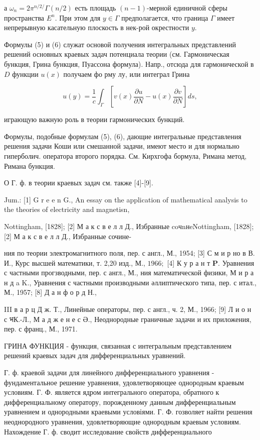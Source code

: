 \documentclass[10pt]{article}
\begin{document}
а $\omega_{n}=2 \pi^{n / 2 /} \Gamma(n / 2)$ есть площадь $(n-1)$-мерной единичной сферы пространства $E^{n}$. При этом для $y \in \Gamma$ предполагается, что граница $\Gamma$ имеет непрерывную касательную плоскость в нек-рой окрестности $y$.



Формулы (5) и (6) служат основой получения интегральных представлений решений основных краевых задач потенциала теории (см. Гармоническая бункция, Грина бункция, Пуассона формула). Напр., отсюда для гармонической в $D$ функции $u(x)$ получаем фо рму лу, или интеграл Грина



\[

u(y)=\frac{1}{c} \int_{\Gamma}\left[v(x) \frac{\partial u}{\partial N}-u(x) \frac{\partial v}{\partial N}\right] d s,

\]



играющую важную роль в теории гармонических бункций.



Формулы, подобные формулам (5), (6), дающие интегральные представления решения задачи Коши или смешанной задачи, имеют место и для нормально гиперболич. оператора второго порядка. См. Кирхгофа бормула, Римана метод, Римана бункция.



О Г. ф. в теории краевых задач см. также [4]-[9].



Jum.: [1] G r e e n G., An essay on the application of mathematical analysis to the theories of electricity and magnetisn,

Nottingham, [1828]; [2] М а к с в е л л Д., Избранные coчnнeNottingham, [1828]; [2] М а к с в е л л Д., Избранные сочине-

ния по теории электромагнитного поля, пер. с англ., М., 1954; [3] С м и р но в В. И., Курс высшей математики, т. 2,20 изд., М., $1966 ;$ [4] К у р а н т $\mathbf{P}$. Уравнения с частными прогзводными, пер. с англ., М., ния математической физики, М и р а н д a K., Уравнения с частными производными әллиптического типа, пер. с итал., М., 1957; [8] Д а н ф о р д Н.,

III в а р ц Д ж. Т., Линейные операторы, пер. с англ., ч. 2, М., 1966; [9] Л и о н с भК.-Л., М а д ж е н е с Ә., Неоднородные граничные задачи и их приложения, пер. с франц., М., 1971.



ГРИНА ФУНКЦИЯ - функция, связанная с интегральным представлением решений краевых задач для дифференциальных уравнений.



Г. ф. краевой задачи для линейного дифференциального уравнения - фундаментальное решение уравнения, удовлетворяющее однородным краевым условиям. Г. Ф. является ядром интегрального оператора, обратного к дифференциальному оператору, порожденному данным дифференциальным уравнением и однородными краевыми условіями. Г. Ф. гозволяет найти решения неоднородного уравнения, удовлетворяющие однородным краевым условиям. Нахождение Г. ф. сводит исследование свойств дифференциального
\end{document}
